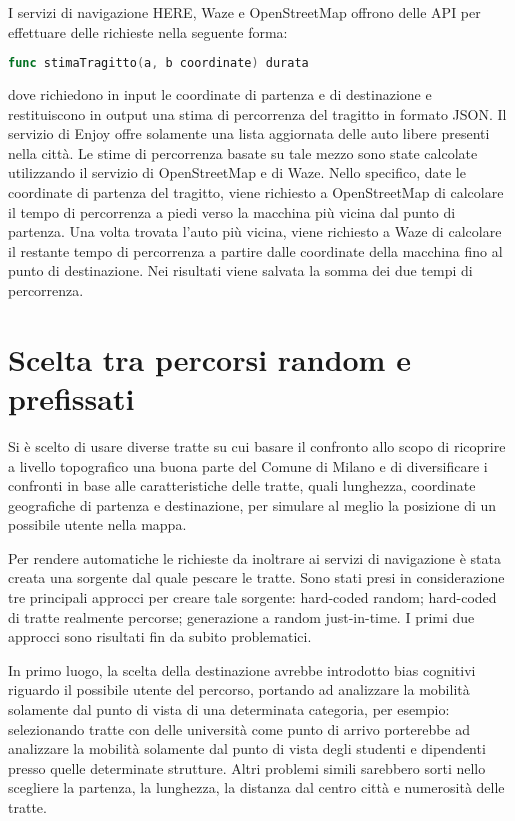 I servizi di navigazione HERE, Waze e OpenStreetMap offrono delle API per effettuare delle richieste nella seguente forma:
\begin{lstlisting}[language=Go]
func stimaTragitto(a, b coordinate) durata
\end{lstlisting}
dove richiedono in input le coordinate di partenza e di destinazione e restituiscono in output una stima di percorrenza del tragitto in formato JSON.
Il servizio di Enjoy offre solamente una lista aggiornata delle auto libere presenti nella città. Le stime di percorrenza basate su tale mezzo sono state calcolate utilizzando il servizio di OpenStreetMap e di Waze. Nello specifico, date le coordinate di partenza del tragitto, viene richiesto a OpenStreetMap di calcolare il tempo di percorrenza a piedi verso la macchina più vicina dal punto di partenza. Una volta trovata l'auto più vicina, viene richiesto a Waze di calcolare il restante tempo di percorrenza a partire dalle coordinate della macchina fino al punto di destinazione. Nei risultati viene salvata la somma dei due tempi di percorrenza.


\section{Scelta tra percorsi random e prefissati}

Si è scelto di usare diverse tratte su cui basare il confronto allo scopo di ricoprire a livello topografico una buona parte del Comune di Milano e di diversificare i confronti in base alle caratteristiche delle tratte, quali lunghezza, coordinate geografiche di partenza e destinazione, per simulare al meglio la posizione di un possibile utente nella mappa.

Per rendere automatiche le richieste da inoltrare ai servizi di navigazione è stata creata una sorgente dal quale pescare le tratte. Sono stati presi in considerazione tre principali approcci per creare tale sorgente: hard-coded random; hard-coded di tratte realmente percorse; generazione a random just-in-time. I primi due approcci sono risultati fin da subito problematici.

In primo luogo, la scelta della destinazione avrebbe introdotto bias cognitivi riguardo il possibile utente del percorso, portando ad analizzare la mobilità solamente dal punto di vista di una determinata categoria, per esempio: selezionando tratte con delle università come punto di arrivo porterebbe ad analizzare la mobilità solamente dal punto di vista degli studenti e dipendenti presso quelle determinate strutture. Altri problemi simili sarebbero sorti nello scegliere la partenza, la lunghezza, la distanza dal centro città e numerosità delle tratte.


